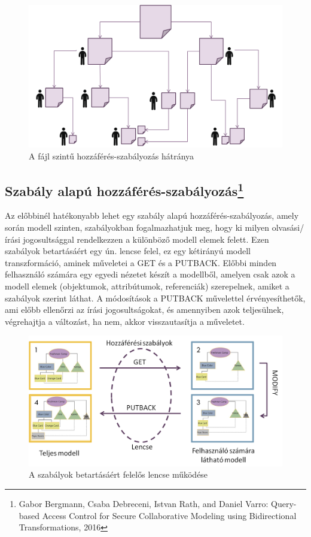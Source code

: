 \begin{figure}[!ht]
	\centering
	\includegraphics[width=150mm, keepaspectratio]{figures/fileLevel.png}
	\caption{A fájl szintű hozzáférés-szabályozás hátránya}
	\label{fig:fileLevel}
\end{figure}

\subsection{Szabály alapú hozzáférés-szabályozás\protect\footnote{Gabor Bergmann, Csaba Debreceni, Istvan Rath, and Daniel Varro: Query-based Access Control for Secure Collaborative Modeling using Bidirectional Transformations, 2016}}
Az előbbinél hatékonyabb lehet egy szabály alapú hozzáférés-szabályozás, amely során modell szinten, szabályokban fogalmazhatjuk meg, hogy ki milyen olvasási/írási jogosultsággal rendelkezzen a különböző modell elemek felett. Ezen szabályok betartásáért egy ún. lencse felel, ez egy kétirányú modell transzformáció, aminek műveletei a GET és a PUTBACK. Előbbi minden felhasználó számára egy egyedi nézetet készít a modellből, amelyen csak azok a modell elemek (objektumok, attribútumok, referenciák) szerepelnek, amiket a szabályok szerint láthat. A módosítások a PUTBACK művelettel érvényesíthetők, ami előbb ellenőrzi az írási jogosultságokat, és amennyiben azok teljesülnek, végrehajtja a változást, ha nem, akkor visszautasítja a műveletet.

\begin{figure}[!ht]
	\centering
	\includegraphics[width=150mm, keepaspectratio]{figures/lens.png}
	\caption{A szabályok betartásáért felelős lencse működése}
	\label{fig:lens}
\end{figure}


